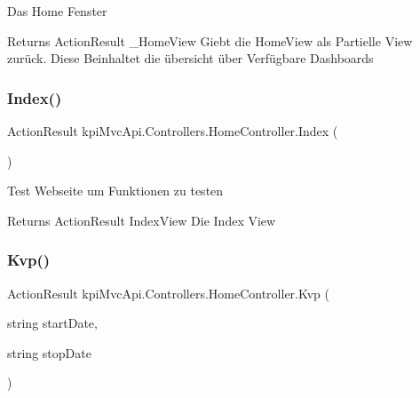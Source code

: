 Das Home Fenster 

\begin{DoxyReturn}{Returns}
{\ttfamily Action\+Result \+\_\+\+Home\+View} Giebt die Home\+View als Partielle View zurück. Diese Beinhaltet die übersicht über Verfügbare Dashboards 
\end{DoxyReturn}
\mbox{\label{classkpi_mvc_api_1_1_controllers_1_1_home_controller_a10e3c3151fdc896f23d1ed374bdcd6cf}} 
\subsubsection{\texorpdfstring{Index()}{Index()}}
{\footnotesize\ttfamily Action\+Result kpi\+Mvc\+Api.\+Controllers.\+Home\+Controller.\+Index (\begin{DoxyParamCaption}{ }\end{DoxyParamCaption})\hspace{0.3cm}{\ttfamily [inline]}}



Test Webseite um Funktionen zu testen 

\begin{DoxyReturn}{Returns}
{\ttfamily  Action\+Result Index\+View } Die Index View 
\end{DoxyReturn}
\mbox{\label{classkpi_mvc_api_1_1_controllers_1_1_home_controller_aab951608121b90d9424bb58c68bd0b23}} 
\subsubsection{\texorpdfstring{Kvp()}{Kvp()}}
{\footnotesize\ttfamily Action\+Result kpi\+Mvc\+Api.\+Controllers.\+Home\+Controller.\+Kvp (\begin{DoxyParamCaption}\item[{string}]{start\+Date,  }\item[{string}]{stop\+Date }\end{DoxyParamCaption})\hspace{0.3cm}{\ttfamily [inline]}}



